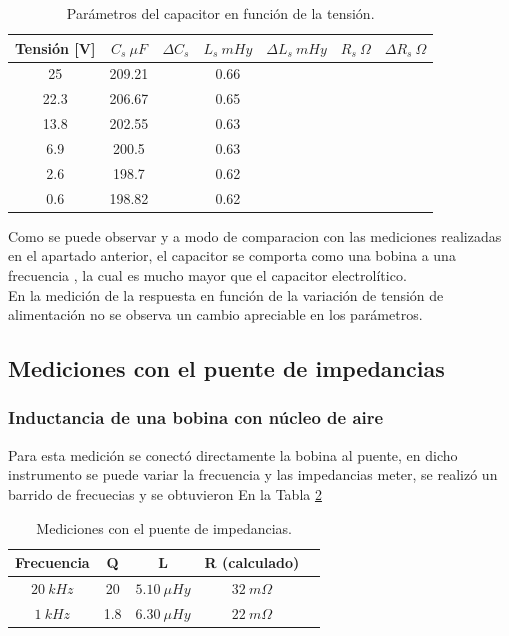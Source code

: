 \documentclass[a4paper,10pt]{article}
\begin{document}
		\begin{table}[!htp]
			\centering
			\begin{tabular}{|c|c|c|c|c|c|c|}
				\hline
				Tensión [V] & $C_s~\mu F$ & $\Delta C_s$ & 
				$L_s~mHy$  & $\Delta L_s~mHy$  & $R_s~\Omega$ & 
				$\Delta R_s~\Omega$ \\
				\hline
				25 &	209.21 &   & 0.66 & \\
				\hline
				22.3 &	206.67 &   & 0.65 & \\
				\hline
				13.8 &	202.55 &   & 0.63 & \\
				\hline
				6.9 &	200.5 &	  & 0.63 & \\
				\hline
				2.6 &	198.7 &	  & 0.62 & \\
				\hline
				0.6 &	198.82 &   & 0.62 & \\
				\hline	  
			\end{tabular}
			\caption{Parámetros del capacitor en función de la tensión.} 
			\label{tab:009}
		\end{table}	
		\indent Como se puede observar y a modo de comparacion con las 
		mediciones realizadas en el apartado anterior, el capacitor se 
		comporta como una bobina a una frecuencia ,
		la cual es  mucho mayor que el capacitor electrolítico. \\
		\indent En la medición de la respuesta en función de la variación de 
		tensión de alimentación no se observa un cambio apreciable en los 
		parámetros.
	\subsection{Mediciones con el puente de impedancias}
		\subsubsection{Inductancia de una bobina con n\'ucleo de aire}
		\indent Para esta medición se conectó directamente la bobina al puente, 
		en dicho instrumento se puede variar la frecuencia y las impedancias
		meter, se realizó un barrido de frecuecias y se obtuvieron 
		En la Tabla \ref{tabPUENTEbobina}
		\begin{table}[!htp]
			\centering
			\begin{tabular}{|c|c|c|c|c|}
				\hline
				Frecuencia & Q & L  & R (calculado) \\
				\hline
				$20~kHz$& 20 & $5.10~\mu Hy$ &$ 32~m\Omega$ \\
				\hline
				$1~kHz$& 1.8 & $6.30~\mu Hy$ &$ 22~m\Omega$ \\
				\hline	  
			\end{tabular}
			\caption{Mediciones con el puente de impedancias.} 
			\label{tabPUENTEbobina}
		\end{table}	
		
\end{document}
